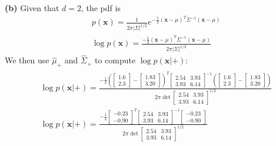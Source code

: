\documentclass[leqno]{article}
\begin{document}
\noindent \textbf{(b)} Given that $d = 2$, the pdf is
\begin{equation*}
\begin{split}
&p(\textbf{x}) = \frac{1}{2\pi|\Sigma|^{1/2}}e^{-\frac{1}{2}(\textbf{x} - \mu)^T\Sigma^{-1}(\textbf{x} - \mu)}\\
&\log p(\textbf{x}) = \frac{-\frac{1}{2}(\textbf{x} - \mu)^T\Sigma^{-1}(\textbf{x} - \mu)}{2\pi|\Sigma|^{1/2}} 
\end{split}
\end{equation*}
We then use $\hat{\mu}_+$ and $\hat{\Sigma}_+$ to compute $\log p(\textbf{x}|+)$:
\begin{gather*}
\begin{split}
&\log p(\textbf{x}|+) = 
\frac{-\frac{1}{2}(\begin{bmatrix}
   1.6\\
   2.3 
\end{bmatrix} - \begin{bmatrix}
   1.83\\
   3.20 
\end{bmatrix})^T\begin{bmatrix}
   2.54 & 3.93\\
   3.93 & 6.14 
\end{bmatrix}^{-1}(\begin{bmatrix}
   1.6\\
   2.3 
\end{bmatrix} - \begin{bmatrix}
   1.83\\
   3.20 
\end{bmatrix})}{2\pi\det{\begin{bmatrix}
   2.54 & 3.93\\
   3.93 & 6.14 
\end{bmatrix}}^{1/2}}\\
&\log p(\textbf{x}|+) = 
\frac{-\frac{1}{2}\begin{bmatrix}
   -0.23\\
   -0.90 
\end{bmatrix}^T\begin{bmatrix}
   2.54 & 3.93\\
   3.93 & 6.14 
\end{bmatrix}^{-1}\begin{bmatrix}
   -0.23\\
   -0.90 
\end{bmatrix}}{2\pi\det{\begin{bmatrix}
   2.54 & 3.93\\
   3.93 & 6.14 
\end{bmatrix}}^{1/2}}\\

\end{split}
\end{gather*}
\end{document}
